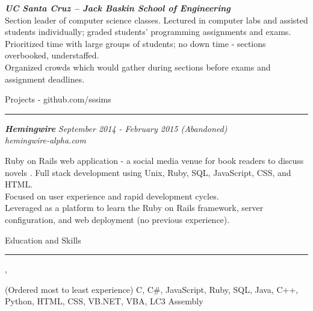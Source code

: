\documentclass[10pt]{article}
\newcommand{\simsbullet}{{\raisebox{2pt}{\tiny $\bullet$}}\hspace{8pt}}
\begin{document}
\setlength{\leftskip}{0pt}

\vskip 8pt

{\bfseries\itshape\sffamily UC Santa Cruz -- Jack Baskin School of Engineering} \hfill {\itshape{}} \\
{\itshape{}}
\vskip 4pt
\setlength{\leftskip}{16pt}
Section leader of computer science classes. Lectured in computer labs and assisted students individually; graded students' programming assignments and exams. 
\vskip 4pt
\simsbullet Prioritized time with large groups of students; no down time - sections overbooked, understaffed.\\
\simsbullet Organized crowds which would gather during sections before exams and assignment deadlines. 

\setlength{\leftskip}{0pt}

\vskip 14pt

{\Large Projects {\small - github.com/sssims}}
\vskip 1pt
\hrule
\vskip 6pt
{\bfseries\itshape\sffamily Hemingwire} \hfill \textsf{\textit{September 2014 - February 2015 (Abandoned)}}\\
\textit{\textsf{hemingwire-alpha.com}} 

\setlength{\leftskip}{16pt}

Ruby on Rails web application - a social media venue for book readers to discuss novels .
\vskip 4pt
\simsbullet Full stack development using Unix, Ruby, SQL, JavaScript, CSS, and HTML. \\
\simsbullet Focused on user experience and rapid development cycles. \\ 
\simsbullet Leveraged as a platform to learn the Ruby on Rails framework, server configuration, and web deployment (no previous experience).

\setlength{\leftskip}{0pt}

\vskip 14pt

{\Large Education and Skills}
\vskip 4pt
\hrule
\vskip 6pt
{}
\vskip 2pt
\hspace*{12pt} {\itshape{}}, {} \\
\hspace*{12pt} {\itshape{}}


\vskip 6pt
{ (Ordered most to least experience)}
\vskip 2pt
\hspace*{12pt} {\sffamily C, C\#, JavaScript, Ruby, SQL, Java, C++, Python, HTML, CSS, VB.NET, VBA, LC3 Assembly}
\end{document}
